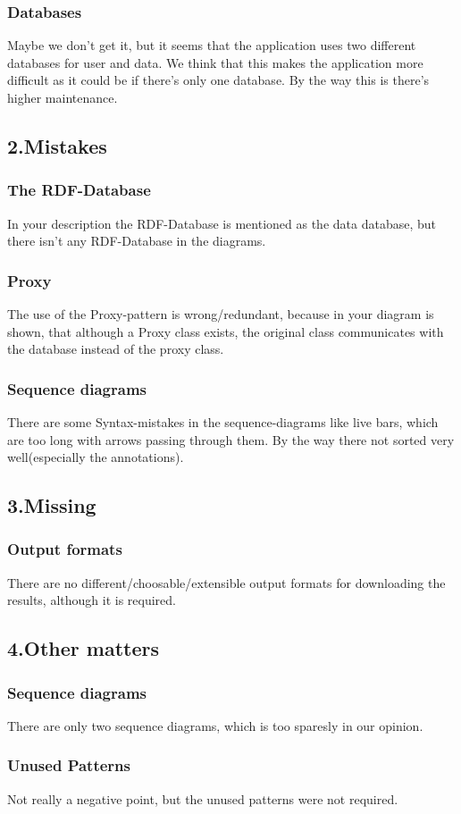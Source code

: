 \documentclass{article}
\begin{document}
\subsubsection{Databases}
Maybe we don't get it, but it seems that the application uses two different databases for user and data. We think that this makes the application more difficult as it could be if there's only one database. By the way this is there's higher maintenance.
\subsection{2.Mistakes}
\subsubsection{The RDF-Database}
In your description the RDF-Database is mentioned as the data database, but there isn't any RDF-Database in the diagrams.
\subsubsection{Proxy}
The use of the Proxy-pattern is wrong/redundant, because in your diagram is shown, that although a Proxy class exists, the original class communicates with the database instead of the proxy class.
\subsubsection{Sequence diagrams}
There are some Syntax-mistakes in the sequence-diagrams like live bars, which are too long with arrows passing through them. By the way there not sorted very well(especially the annotations).
\subsection{3.Missing}
\subsubsection{Output formats}
There are no different/choosable/extensible output formats for downloading the results, although it is required.
\subsection{4.Other matters}
\subsubsection{Sequence diagrams}
There are only two sequence diagrams, which is too sparesly in our opinion.
\subsubsection{Unused Patterns}
Not really a negative point, but the unused patterns were not required.
\end{document}
